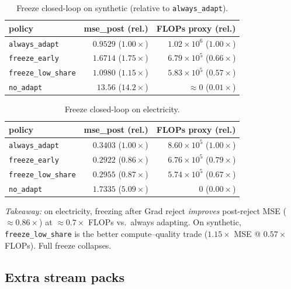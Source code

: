 \documentclass[11pt]{article}
\begin{document}
\begin{table}[h]
\centering
\caption{Freeze closed-loop on synthetic (relative to \texttt{always\_adapt}).}
\label{tab:freeze-syn}
\begin{tabular}{lrr}
\toprule
policy & mse\_post (rel.) & FLOPs proxy (rel.) \\
\midrule
\texttt{always\_adapt}     & $0.9529$ ($1.00\times$) & $1.02\!\times\!10^6$ ($1.00\times$) \\
\texttt{freeze\_early}     & $1.6714$ ($1.75\times$) & $6.79\!\times\!10^5$ ($0.66\times$) \\
\texttt{freeze\_low\_share}& $1.0980$ ($1.15\times$) & $5.83\!\times\!10^5$ ($0.57\times$) \\
\texttt{no\_adapt}         & $13.56$  ($14.2\times$) & $\approx 0$ ($0.01\times$) \\
\bottomrule
\end{tabular}
\end{table}

\begin{table}[h]
\centering
\caption{Freeze closed-loop on electricity.}
\label{tab:freeze-elec}
\begin{tabular}{lrr}
\toprule
policy & mse\_post (rel.) & FLOPs proxy (rel.) \\
\midrule
\texttt{always\_adapt}     & $0.3403$ ($1.00\times$) & $8.60\!\times\!10^5$ ($1.00\times$) \\
\texttt{freeze\_early}     & $0.2922$ ($0.86\times$) & $6.76\!\times\!10^5$ ($0.79\times$) \\
\texttt{freeze\_low\_share}& $0.2955$ ($0.87\times$) & $5.74\!\times\!10^5$ ($0.67\times$) \\
\texttt{no\_adapt}         & $1.7335$ ($5.09\times$) & $0$ ($0.00\times$) \\
\bottomrule
\end{tabular}
\end{table}

\noindent\textit{Takeaway:} on electricity, freezing after Grad reject
\emph{improves} post-reject MSE ($\approx 0.86\times$) at
$\approx 0.7\times$ FLOPs vs.\ always adapting. On synthetic,
\texttt{freeze\_low\_share} is the better compute--quality trade
($1.15\times$ MSE @ $0.57\times$ FLOPs). Full freeze collapses.

\subsection{Extra stream packs}
\label{sec:packs}
\end{document}
